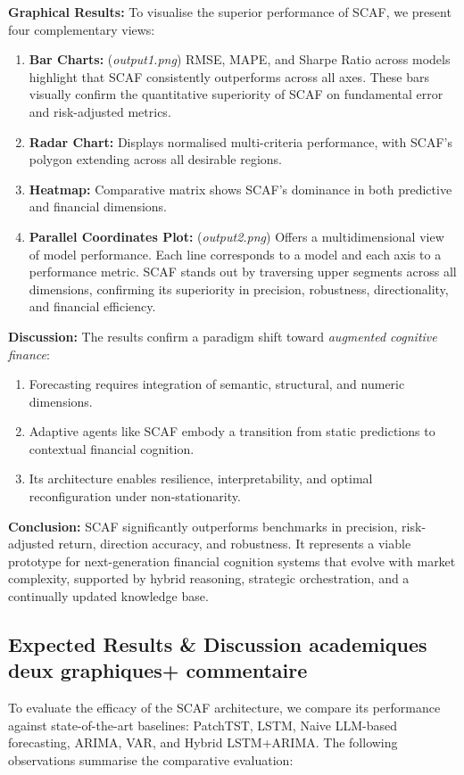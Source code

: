 \documentclass[conference]{IEEEtran}
\begin{document}
\textbf{Graphical Results:}
To visualise the superior performance of SCAF, we present four complementary views:
\begin{enumerate}
    \item \textbf{Bar Charts:} (\textit{output1.png}) RMSE, MAPE, and Sharpe Ratio across models highlight that SCAF consistently outperforms across all axes. These bars visually confirm the quantitative superiority of SCAF on fundamental error and risk-adjusted metrics.
    \item \textbf{Radar Chart:} Displays normalised multi-criteria performance, with SCAF's polygon extending across all desirable regions.
    \item \textbf{Heatmap:} Comparative matrix shows SCAF’s dominance in both predictive and financial dimensions.
    \item \textbf{Parallel Coordinates Plot:} (\textit{output2.png}) Offers a multidimensional view of model performance. Each line corresponds to a model and each axis to a performance metric. SCAF stands out by traversing upper segments across all dimensions, confirming its superiority in precision, robustness, directionality, and financial efficiency.
\end{enumerate}

\textbf{Discussion:}
The results confirm a paradigm shift toward \emph{augmented cognitive finance}:
\begin{enumerate}
    \item Forecasting requires integration of semantic, structural, and numeric dimensions.
    \item Adaptive agents like SCAF embody a transition from static predictions to contextual financial cognition.
    \item Its architecture enables resilience, interpretability, and optimal reconfiguration under non-stationarity.
\end{enumerate}

\textbf{Conclusion:}
SCAF significantly outperforms benchmarks in precision, risk-adjusted return, direction accuracy, and robustness. It represents a viable prototype for next-generation financial cognition systems that evolve with market complexity, supported by hybrid reasoning, strategic orchestration, and a continually updated knowledge base.
\subsection{Expected Results & Discussion academiques deux graphiques+ commentaire}
To evaluate the efficacy of the SCAF architecture, we compare its performance against state-of-the-art baselines: PatchTST, LSTM, Naive LLM-based forecasting, ARIMA, VAR, and Hybrid LSTM+ARIMA. The following observations summarise the comparative evaluation:
\end{document}
